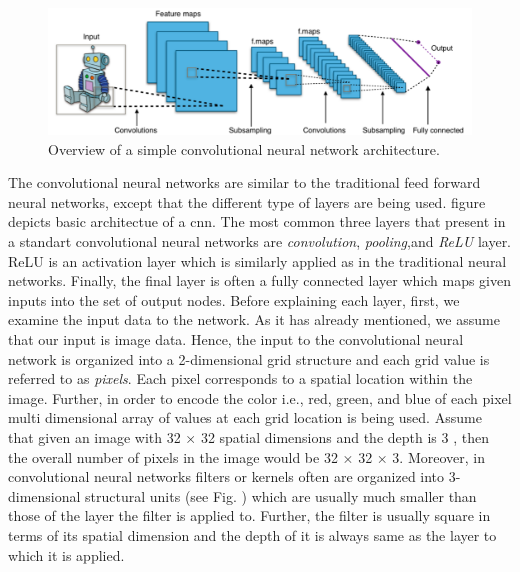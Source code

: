 \begin{figure}[h]
\centering
 \includegraphics[width=\linewidth]{Figures/fig_cnn.png}
 \caption{Overview of a simple convolutional neural network architecture.}
 \label{fig:perceptron}
\end{figure}

The convolutional neural networks are similar to the traditional feed forward neural networks, except that the different type of layers are being used. figure depicts basic architectue of a cnn. The most common three layers that present in a standart convolutional neural networks are \textit{convolution}, \textit{pooling},and \textit{ReLU} layer. ReLU is an activation layer which is similarly applied as in the traditional neural networks. Finally, the final layer is often a fully connected layer which maps given inputs into the set of output nodes. Before explaining each layer, first, we examine the input data to the network. As it has already mentioned, we assume that our input is image data. Hence, the input to the convolutional neural network is organized into a 2-dimensional grid structure and each grid value is referred to as \textit{pixels}. Each pixel corresponds to a spatial location within the image. Further, in order to encode the color i.e., red, green, and blue of each pixel multi dimensional array of values at each grid location is being used. Assume that given an image with 32 × 32 spatial dimensions and the depth is 3 , then the overall number of pixels in the image would be 32 × 32 × 3. Moreover, in convolutional neural networks filters or kernels often are organized into 3-dimensional structural units (see Fig. ) which are usually much smaller than those of the layer the filter is applied to. Further, the filter is usually square in terms of its spatial dimension and the depth of it is always same as the layer to which it is applied. 

